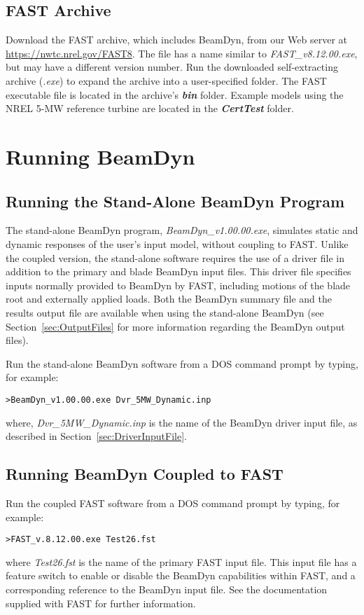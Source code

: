 \subsection{FAST Archive}
Download the FAST archive, which includes BeamDyn, from our Web server at \url{https://nwtc.nrel.gov/FAST8}. 
The file has a name similar to \textit{FAST\_v8.12.00.exe}, but may have a different version number. 
Run the downloaded self-extracting archive ({\it .exe}) to expand the archive into a user-specified folder. 
The FAST executable file is located in the archive's \textbf{{\it bin}} folder. 
Example models using the NREL 5-MW reference turbine are located in the \textbf{{\it CertTest}} folder.

\section{Running BeamDyn}
\subsection{Running the Stand-Alone BeamDyn Program}
The stand-alone BeamDyn program, {\it BeamDyn\_v1.00.00.exe}, simulates static and dynamic responses of the user's input model, without coupling to FAST. 
Unlike the coupled version, the stand-alone software requires the use of a driver file in addition to the primary and blade BeamDyn input files. 
This driver file specifies inputs normally provided to BeamDyn by FAST, including motions of the blade root and externally applied loads. 
Both the BeamDyn summary file and the results output file are available when using the stand-alone BeamDyn (see Section~\ref{sec:OutputFiles} for more information regarding the BeamDyn output files).

Run the stand-alone BeamDyn software from a DOS command prompt by typing, for example:
\begin{verbatim}
>BeamDyn_v1.00.00.exe Dvr_5MW_Dynamic.inp
\end{verbatim}
where, {\it Dvr\_5MW\_Dynamic.inp} is the name of the BeamDyn driver input file, as described in Section~\ref{sec:DriverInputFile}.

\subsection{Running BeamDyn Coupled to FAST}
Run the coupled FAST software from a DOS command prompt by typing, for example:
\begin{verbatim}
>FAST_v.8.12.00.exe Test26.fst
\end{verbatim}
where {\it Test26.fst} is the name of the primary FAST input file. This input file has a feature switch to enable or disable the BeamDyn capabilities within FAST, and a corresponding reference to the BeamDyn input file. See the documentation supplied with FAST for further information.




